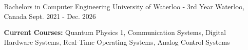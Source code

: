 

\begin{cventries}

	\cventry
	{Bachelors in Computer Engineering} %
	{University of Waterloo - 3rd Year} %
	{Waterloo, Canada} %
	{Sept. 2021 - Dec. 2026} %
	{
		\begin{cvitems} %
			\item {\textbf{Current Courses:} Quantum Physics 1, Communication Systems, Digital Hardware Systems, Real-Time Operating Systems, Analog Control Systems}
		\end{cvitems}
	}

\end{cventries}
